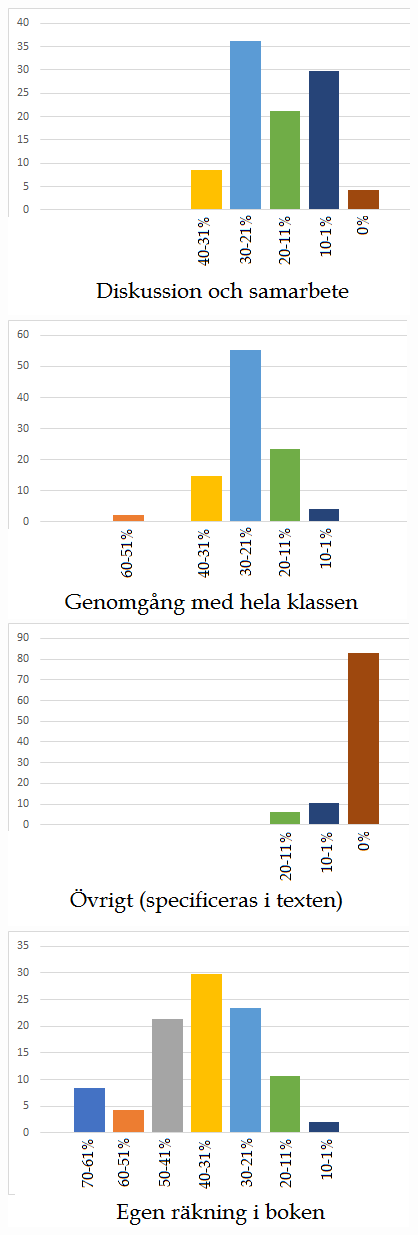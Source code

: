 \begin{figure}
    \includegraphics{Figures/Barcharts/diskussion.png}
    \includegraphics{Figures/Barcharts/genomgang.png}
    \includegraphics{Figures/Barcharts/ovrigt.png}
    \includegraphics{Figures/Barcharts/rankning.png}

\end{figure}
